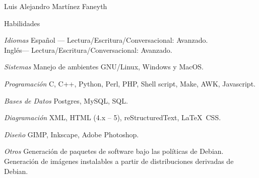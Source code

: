 \documentclass[letterpaper]{scrartcl}
\begin{document}
\begin{cv}{Luis Alejandro Mart\'inez Faneyth}
\begin{cvlist}{Habilidades}
\item[\textit{\large{Idiomas}}]{
	Espa\~nol --- Lectura/Escritura/Conversacional: Avanzado.\\
	Ingl\'es--- Lectura/Escritura/Conversacional: Avanzado.
}
\item[\textit{\large{Sistemas}}]{Manejo de ambientes GNU/Linux, Windows y MacOS.}
\item[\textit{\large{Programaci\'on}}]{C, C++, Python, Perl, PHP, Shell script, Make, AWK, Javascript.}
\item[\textit{\large{Bases de Datos}}]{Postgres, MySQL, SQL.}
\item[\textit{\large{Diagramaci\'on}}]{XML, HTML (4.x -- 5), reStructuredText, \LaTeX\, CSS.}
\item[\textit{\large{Dise\~no}}]{GIMP, Inkscape, Adobe Photoshop.}
\item[\textit{\large{Otros}}]{
	Generación de paquetes de software bajo las políticas de Debian.\\
	Generación de imágenes instalables a partir de distribuciones derivadas de Debian.
}
\end{cvlist}

\end{cv}
\end{document}
